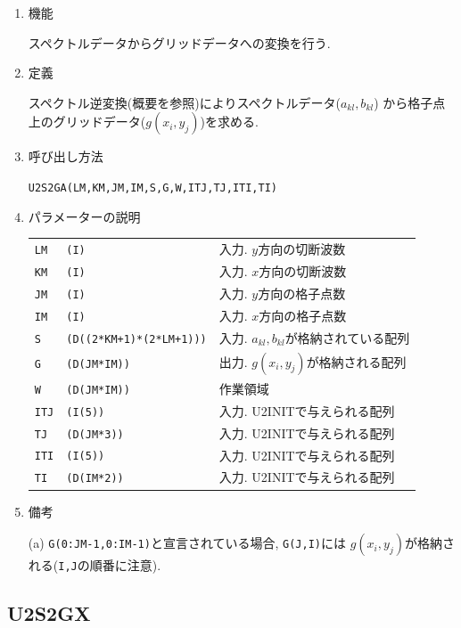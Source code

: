 \documentclass[a4j,fleqn]{jarticle}
\begin{document}
\begin{enumerate}

\item 機能 

スペクトルデータからグリッドデータへの変換を行う.

\item 定義

スペクトル逆変換(概要を参照)によりスペクトルデータ($a_{kl},b_{kl}$)
から格子点上のグリッドデータ($g(x_i,y_j)$)を求める.

\item 呼び出し方法 

{\tt U2S2GA(LM,KM,JM,IM,S,G,W,ITJ,TJ,ITI,TI)}
  
\item パラメーターの説明

\begin{tabular}{lll}
{\tt LM} & {\tt (I)} & 入力. $y$方向の切断波数\\
{\tt KM} & {\tt (I)} & 入力. $x$方向の切断波数\\
{\tt JM} & {\tt (I)} & 入力. $y$方向の格子点数\\
{\tt IM} & {\tt (I)} & 入力. $x$方向の格子点数\\
{\tt S} & {\tt (D((2*KM+1)*(2*LM+1)))} & 入力. $a_{kl},b_{kl}$が格納されている配列\\
{\tt G} & {\tt (D(JM*IM))} & 出力. $g(x_i,y_j)$が格納される配列\\
{\tt W} & {\tt (D(JM*IM))} & 作業領域\\
{\tt ITJ} & {\tt (I(5))} & 入力. U2INITで与えられる配列\\
{\tt TJ} & {\tt (D(JM*3))} & 入力. U2INITで与えられる配列\\
{\tt ITI} & {\tt (I(5))} & 入力. U2INITで与えられる配列\\
{\tt TI} & {\tt (D(IM*2))} & 入力. U2INITで与えられる配列
\end{tabular}

\item 備考

(a) {\tt G(0:JM-1,0:IM-1)}と宣言されている場合, {\tt G(J,I)}には
    $g(x_i,y_j)$が格納される({\tt I,J}の順番に注意).

\end{enumerate}


\subsection{U2S2GX}
\end{document}
